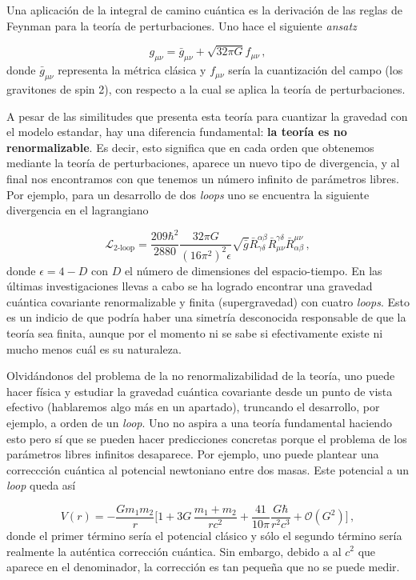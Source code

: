 \documentclass[11pt,a4paper,titlepage]{article}
\begin{document}
Una aplicación de la integral de camino cuántica es la derivación de las reglas de Feynman para la teoría de perturbaciones. Uno hace el siguiente \emph{ansatz}

\begin{equation*}
 g_{\mu\nu}=\bar{g}_{\mu\nu}+\sqrt{32\pi G}f_{\mu\nu}\,,
\end{equation*}
donde $\bar{g}_{\mu\nu}$ representa la métrica clásica y $f_{\mu\nu}$ sería la cuantización del campo (los gravitones de spin 2), con respecto a la cual se aplica la teoría de perturbaciones.

A pesar de las similitudes que presenta esta teoría para cuantizar la gravedad con el modelo estandar, hay una diferencia fundamental: \textbf{la teoría es no renormalizable}. Es decir, esto significa que en cada orden que obtenemos mediante la teoría de perturbaciones, aparece un nuevo tipo de divergencia, y al final nos encontramos con que tenemos un número infinito de parámetros libres. Por ejemplo, para un desarrollo de dos \emph{loops} uno se encuentra la siguiente divergencia en el lagrangiano

\begin{equation*}
 \mathscr{L}_\text{2-loop}=\frac{209\hbar^2}{2880}\frac{32\pi G}{(16\pi^2)^2\epsilon}\sqrt{\bar{g}}\bar{R}^{\alpha\beta}_{\gamma\delta}\bar{R}^{\gamma\delta}_{\mu\nu}\bar{R}^{\mu\nu}_{\alpha\beta}\,,
\end{equation*}
donde $\epsilon=4-D$ con $D$ el número de dimensiones del espacio-tiempo. En las últimas investigaciones llevas a cabo \cite{bern} se ha logrado encontrar una gravedad cuántica covariante renormalizable y finita (supergravedad) con cuatro \emph{loops}. Esto es un indicio de que podría haber una simetría desconocida responsable de que la teoría sea finita, aunque por el momento ni se sabe si efectivamente existe ni mucho menos cuál es su naturaleza.

Olvidándonos del problema de la no renormalizabilidad de la teoría, uno puede hacer física y estudiar la gravedad cuántica covariante desde un punto de vista efectivo (hablaremos algo más en un apartado), truncando el desarrollo, por ejemplo, a orden de un \emph{loop}. Uno no aspira a una teoría fundamental haciendo esto pero sí que se pueden hacer predicciones concretas porque el problema de los parámetros libres infinitos desaparece. Por ejemplo, uno puede plantear una correccción cuántica al potencial newtoniano entre dos masas. Este potencial a un \emph{loop} queda así

\begin{equation*}
 V(r)=-\frac{Gm_1m_2}{r}\Bigg[1+3G\,\frac{m_1+m_2}{rc^2}+\frac{41}{10\pi}\frac{G\hbar}{r^2c^3}+\mathcal{O}(G^2)\Bigg]\,,
\end{equation*}
donde el primer término sería el potencial clásico y sólo el segundo término sería realmente la auténtica corrección cuántica. Sin embargo, debido a al $c^2$ que aparece en el denominador, la corrección es tan pequeña que no se puede medir.
\end{document}
